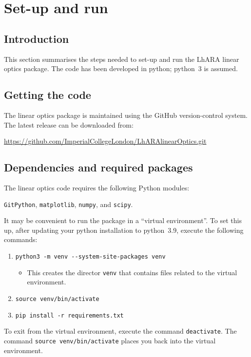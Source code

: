 \section{Set-up and run}

\subsection*{Introduction}
This section summarises the steps needed to set-up and run
the LhARA linear optics package. 
The code has been developed in python; python~3 is assumed.

\subsection*{Getting the code}
The linear optics package is maintained using the GitHub
version-control system.
The latest release can be downloaded from: \\
\begin{center}
  \href{https://github.com/ImperialCollegeLondon/LhARAlinearOptics.git}%
       {https://github.com/ImperialCollegeLondon/LhARAlinearOptics.git}
\end{center}

\subsection*{Dependencies and required packages}
The linear optics code requires the following Python modules: \\
\begin{center}
  \verb+GitPython+, \verb+matplotlib+, \verb+numpy+, and \verb+scipy+.
\end{center}

It may be convenient to run the package in a ``virtual environment''.
To set this up, after updating your python installation to python~3.9,
execute the following commands:
\begin{enumerate}
  \item \verb+python3 -m venv --system-site-packages venv+
    \begin{itemize}
      \item This creates the director \verb+venv+ that contains files
        related to the virtual environment.
    \end{itemize}
  \item \verb+source venv/bin/activate+
  \item \verb+pip install -r requirements.txt+
\end{enumerate}
To exit from the virtual environment, execute the command
\verb+deactivate+. 
The command \verb+source venv/bin/activate+ places you back
into the virtual environment.

